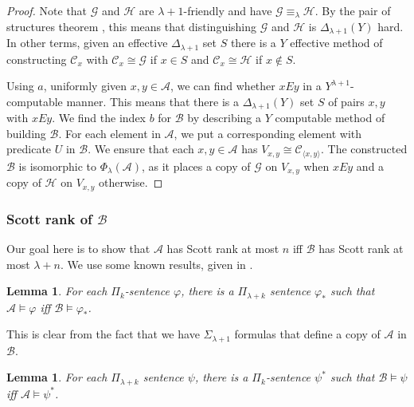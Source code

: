 \documentclass{article}
\newtheorem{lem}[thm]{Lemma}
\begin{document}
\begin{proof}

Note that $\mathcal{G}$ and $\mathcal{H}$ are $\lambda+1$-friendly and have $\mathcal{G}\equiv_\lambda\mathcal{H}$.
By the pair of structures theorem \cite{AK}, this means that distinguishing $\mathcal{G}$ and $\mathcal{H}$ is $\Delta_{\lambda+1}(Y)$ hard.
In other terms, given an effective $\Delta_{\lambda+1}$ set $S$ there is a $Y$ effective method of constructing $\mathcal{C}_x$ with $\mathcal{C}_x\cong\mathcal{G}$ if $x\in S$ and $\mathcal{C}_x\cong\mathcal{H}$ if $x\not\in S$.

Using $a$, uniformly given $x,y\in\mathcal{A}$, we can find whether $xEy$ in a $Y^{\lambda+1}$-computable manner.
This means that there is a $\Delta_{\lambda+1}(Y)$ set $S$ of pairs $x,y$ with $xEy$.
We find the index $b$ for $\mathcal{B}$ by describing a $Y$ computable method of building $\mathcal{B}$.
For each element in $\mathcal{A}$, we put a corresponding element with predicate $U$ in $\mathcal{B}$.
We ensure that each $x,y\in\mathcal{A}$ has $V_{x,y}\cong \mathcal{C}_{\langle x,y \rangle}$.
The constructed $\mathcal{B}$ is isomorphic to $\Phi_\lambda(\mathcal{A})$, as it places a copy of $\mathcal{G}$ on $V_{x,y}$ when $xEy$ and a copy of $\mathcal{H}$ on $V_{x,y}$ otherwise.
\end{proof}

\subsubsection{Scott rank of $\mathcal{B}$}

Our goal here is to show that $\mathcal{A}$ has Scott rank at most $n$ iff $\mathcal{B}$ has Scott rank at most $\lambda+n$.  We use some known results, given in \cite[Section 5]{CGHT}.   

\begin{lem}

For each $\Pi_k$-sentence $\varphi$, there is a $\Pi_{\lambda+k}$ sentence $\varphi_*$ such that $\mathcal{A}\models\varphi$ iff $\mathcal{B}\models\varphi_*$.

\end{lem}
  
This is clear from the fact that we have $\Sigma_{\lambda+1}$ formulas that define a copy of $\mathcal{A}$ in $\mathcal{B}$. 

\begin{lem}

For each $\Pi_{\lambda+k}$ sentence $\psi$, there is a $\Pi_k$-sentence $\psi^*$ such that 
$\mathcal{B}\models\psi$ iff $\mathcal{A}\models\psi^*$.  

\end{lem}
\end{document}
